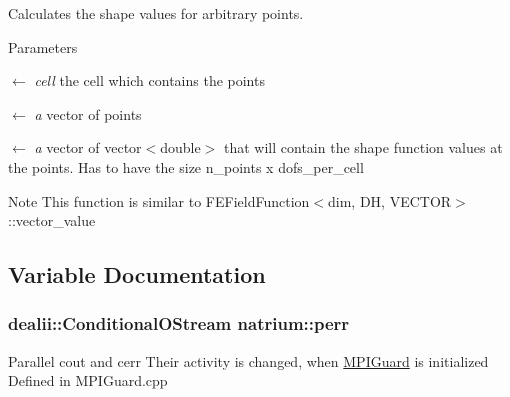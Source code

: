 Calculates the shape values for arbitrary points. 
\begin{DoxyParams}{Parameters}
\item[\mbox{$\leftarrow$} {\em cell}]the cell which contains the points \item[\mbox{$\leftarrow$} {\em a}]vector of points \item[\mbox{$\leftarrow$} {\em a}]vector of vector$<$double$>$ that will contain the shape function values at the points. Has to have the size n\_\-points x dofs\_\-per\_\-cell \end{DoxyParams}
\begin{DoxyNote}{Note}
This function is similar to FEFieldFunction$<$dim, DH, VECTOR$>$::vector\_\-value 
\end{DoxyNote}


\subsection{Variable Documentation}
\hypertarget{namespacenatrium_a3cedd4d2c74ed3a6e0f61166ddff40d1}{
\subsubsection[{perr}]{\setlength{\rightskip}{0pt plus 5cm}dealii::ConditionalOStream {\bf natrium::perr}}}
\label{namespacenatrium_a3cedd4d2c74ed3a6e0f61166ddff40d1}
Parallel cout and cerr Their activity is changed, when \hyperlink{classnatrium_1_1MPIGuard}{MPIGuard} is initialized Defined in MPIGuard.cpp 